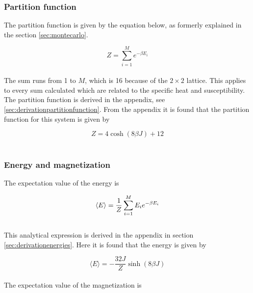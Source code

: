 \documentclass{article}
\begin{document}
\subsubsection{Partition function} \label{sec:partitionfunction}

The partition function is given by the equation below, as formerly explained in the section \ref{sec:montecarlo}.

\begin{equation} \label{eq:partitionfunction}
    Z = \sum_{i=1} ^{M} e^{- \beta E_i}
\end{equation} \\

The sum runs from 1 to $M$, which is 16 because of the $ 2 \times 2 $ lattice. This applies to every sum calculated which are related to the specific heat and susceptibility. \\

The partition function is derived in the appendix, see \ref{sec:derivationpartitionfunction}. From the appendix it is found that the partition function for this system is given by

\begin{equation} \label{eq:finalpartitionfunction}
    Z = 4 \cosh(8 \beta J) + 12
\end{equation} \\


\subsubsection{Energy and magnetization} \label{sec:energyandmagnetization}

The expectation value of the energy is

\begin{equation}    \label{eq:expectationenergy}
    \langle E \rangle = \frac{1}{Z} \sum _{i=1} ^M E_i e^{- \beta E_i} \\
\end{equation} \\

This analytical expression is derived in the appendix in section \ref{sec:derivationenergies}. Here it is found that the energy is given by

\begin{equation} \label{eq:finalenergy}
    \langle E \rangle = - \frac{32 J}{Z} \sinh(8 \beta J)
\end{equation} \\

The expectation value of the magnetization is
\end{document}
